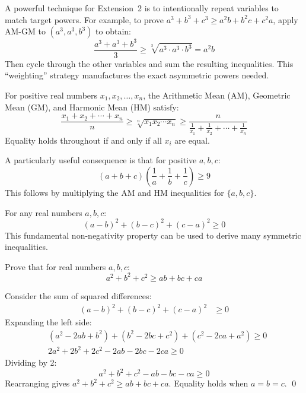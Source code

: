 \documentclass[12pt]{article}
\newenvironment{remark}[1][]{%
  \begin{remarkbox}[title={\bfseries Remark~\thetcbcounter\ifx\relax#1\relax\else\ (#1)\fi}]%
}{%
  \end{remarkbox}%
}
\begin{document}
\begin{remark}[Lopsided/Majorising AM-GM]
A powerful technique for Extension~2 is to intentionally repeat variables to match target powers. For example, to prove $a^3 + b^3 + c^3 \ge a^2b + b^2c + c^2a$, apply AM-GM to $(a^3, a^3, b^3)$ to obtain:
\[
\frac{a^3 + a^3 + b^3}{3} \ge \sqrt[3]{a^3 \cdot a^3 \cdot b^3} = a^2b
\]
Then cycle through the other variables and sum the resulting inequalities. This ``weighting'' strategy manufactures the exact asymmetric powers needed.
\end{remark}

\begin{theorembox}[title={\bfseries AM-GM-HM Inequality Chain}]
For positive real numbers $x_1, x_2, \ldots, x_n$, the Arithmetic Mean (AM), Geometric Mean (GM), and Harmonic Mean (HM) satisfy:
\[
\frac{x_1 + x_2 + \cdots + x_n}{n} \ge \sqrt[n]{x_1 x_2 \cdots x_n} \ge \frac{n}{\frac{1}{x_1} + \frac{1}{x_2} + \cdots + \frac{1}{x_n}}
\]
Equality holds throughout if and only if all $x_i$ are equal.
\end{theorembox}

\begin{remark}[Fundamental AM-HM Application]
A particularly useful consequence is that for positive $a, b, c$:
\[
(a+b+c)\left(\frac{1}{a}+\frac{1}{b}+\frac{1}{c}\right) \ge 9
\]
This follows by multiplying the AM and HM inequalities for $\{a,b,c\}$.
\end{remark}

\begin{theorembox}[title={\bfseries Sum of Squares (SOS) Method}]
For any real numbers $a, b, c$:
\[
(a-b)^2 + (b-c)^2 + (c-a)^2 \ge 0
\]
This fundamental non-negativity property can be used to derive many symmetric inequalities.
\end{theorembox}

\begin{examplebox}[title={\bfseries SOS Application}]
Prove that for real numbers $a, b, c$:
\[
a^2 + b^2 + c^2 \ge ab + bc + ca
\]
\end{examplebox}

\begin{solution}
Consider the sum of squared differences:
\begin{align*}
(a-b)^2 + (b-c)^2 + (c-a)^2 &\ge 0
\end{align*}
Expanding the left side:
\begin{align*}
&(a^2 - 2ab + b^2) + (b^2 - 2bc + c^2) + (c^2 - 2ca + a^2) \ge 0\\
&2a^2 + 2b^2 + 2c^2 - 2ab - 2bc - 2ca \ge 0
\end{align*}
Dividing by 2:
\[
a^2 + b^2 + c^2 - ab - bc - ca \ge 0
\]
Rearranging gives $a^2 + b^2 + c^2 \ge ab + bc + ca$. Equality holds when $a = b = c$. \qed
\end{solution}
\end{document}
